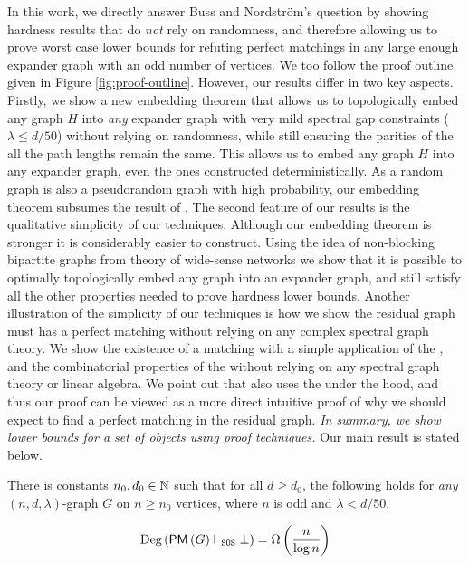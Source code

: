 \documentclass[11pt]{article}
\begin{document}
In this work, we directly answer Buss and Nordstr{\"o}m's question by showing hardness results that do \emph{not} rely on randomness, and therefore allowing us to prove worst case lower bounds for refuting perfect matchings in any large enough expander graph with an odd number of vertices.
We too follow the proof outline given in Figure \ref{fig:proof-outline}.
However, our results differ in two key aspects.
Firstly, we show a new embedding theorem that allows us to topologically embed any graph $H$ into \emph{any} expander graph with very mild spectral gap constraints ($\lambda \leq d/50$) without relying on randomness, while still ensuring the parities of the all the path lengths remain the same.
This allows us to embed any graph $H$ into any expander graph, even the ones constructed deterministically.
As a random graph is also a pseudorandom graph with high probability, our embedding theorem subsumes the result of \citet{Austrin_2022}.
The second feature of our results is the qualitative simplicity of our techniques.
Although our embedding theorem is stronger it is considerably easier to construct.
Using the idea of non-blocking bipartite graphs from theory of wide-sense networks \citep{feldman1988wide} we show that it is possible to optimally topologically embed any graph into an expander graph, and still satisfy all the other properties needed to prove hardness lower bounds.
Another illustration of the simplicity of our techniques is how we show the residual graph must has a perfect matching without relying on any complex spectral graph theory.
We show the existence of a matching with a simple application of the , and the combinatorial properties of the  without relying on any spectral graph theory or linear algebra.
We point out that \citep[Theorem 2.3]{brouwer2005eigenvalues} also uses the  under the hood, and thus our proof can be viewed as a more direct intuitive proof of why we should expect to find a perfect matching in the residual graph.
\textit{In summary, we show  lower bounds for a  set of objects using  proof techniques. 
} Our main result is stated below.

\begin{theorem}\label{thm:main-thm}

  There is constants $n_0, d_0 \in \mathbb{N}$ such that for all $d \geq d_0$, the following holds for \emph{any} $(n, d, \lambda)$-graph $G$ on $n \geq n_0$ vertices, where $n$ is odd and $\lambda < d/50$. 

  \[ \text{Deg}\left(\mathsf{PM}\left(G\right) \vdash_{\texttt{SOS}} \bot\right) = \Omega\left(\frac{n}{\log n}\right)\]

\end{theorem}
\end{document}
